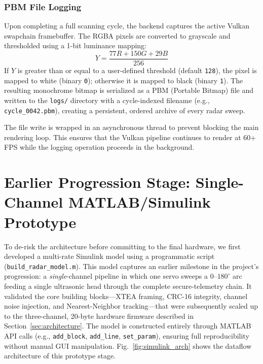 \documentclass[conference]{IEEEtran}
\begin{document}
\subsubsection{PBM File Logging}
Upon completing a full scanning cycle, the backend captures the active Vulkan swapchain framebuffer. The RGBA pixels are converted to grayscale and thresholded using a 1-bit luminance mapping:
\begin{equation}
    Y = \frac{77R + 150G + 29B}{256}
    \label{eq:luminance}
\end{equation}
If $Y$ is greater than or equal to a user-defined threshold (default \texttt{128}), the pixel is mapped to white (binary \texttt{0}); otherwise it is mapped to black (binary \texttt{1}). The resulting monochrome bitmap is serialized as a PBM (Portable Bitmap) file and written to the \texttt{logs/} directory with a cycle-indexed filename (e.g., \texttt{cycle\_0042.pbm}), creating a persistent, ordered archive of every radar sweep.

The file write is wrapped in an asynchronous thread to prevent blocking the main rendering loop. This ensures that the Vulkan pipeline continues to render at 60+ FPS while the logging operation proceeds in the background.

\section{Earlier Progression Stage: Single-Channel MATLAB/Simulink Prototype}
\label{sec:simulink}
To de-risk the architecture before committing to the final hardware, we first developed a multi-rate Simulink model using a programmatic script (\texttt{build\_radar\_model.m}). This model captures an earlier milestone in the project's progression: a \emph{single}-channel pipeline in which one servo sweeps a $0$--$180^\circ$ arc feeding a single ultrasonic head through the complete secure-telemetry chain. It validated the core building blocks---XTEA framing, CRC-16 integrity, channel noise injection, and Nearest-Neighbor tracking---that were subsequently scaled up to the three-channel, 20-byte hardware firmware described in Section~\ref{sec:architecture}. The model is constructed entirely through MATLAB API calls (e.g., \texttt{add\_block}, \texttt{add\_line}, \texttt{set\_param}), ensuring full reproducibility without manual GUI manipulation. Fig.~\ref{fig:simulink_arch} shows the dataflow architecture of this prototype stage.
\end{document}
